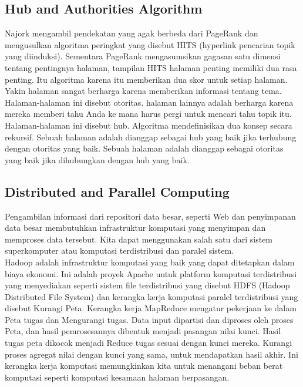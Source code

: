 \documentclass[conference]{IEEEtran}
\begin{document}
\subsection{Hub and Authorities Algorithm}
Najork\cite{najork2007comparing} mengambil pendekatan yang agak berbeda dari PageRank
dan mengusulkan algoritma peringkat yang disebut HITS (hyperlink
pencarian topik yang diinduksi). Sementara PageRank mengasumsikan gagasan satu dimensi tentang pentingnya halaman, tampilan HITS
halaman penting memiliki dua rasa penting.\cite{rajaraman2011mining} Itu
algoritma karena itu memberikan dua skor untuk setiap halaman. Yakin
halaman sangat berharga karena memberikan informasi tentang
tema. Halaman-halaman ini disebut otoritas. halaman lainnya adalah
berharga karena mereka memberi tahu Anda ke mana harus pergi untuk mencari tahu
topik itu. Halaman-halaman ini disebut hub. Algoritma mendefinisikan
dua konsep secara rekursif. Sebuah halaman adalah
dianggap sebagai hub yang baik jika terhubung dengan otoritas yang baik. Sebuah halaman adalah
dianggap sebagai otoritas yang baik jika dihubungkan dengan hub yang baik.\cite{rajaraman2011mining}

\subsection{Distributed and Parallel Computing}
Pengambilan informasi dari repositori data besar, seperti
Web dan penyimpanan data besar membutuhkan infrastruktur komputasi yang
menyimpan dan memproses data tersebut. Kita dapat menggunakan salah satu dari
sistem superkomputer atau komputasi terdistribusi dan paralel
sistem.\\

Hadoop\cite{dean2008mapreduce} adalah infrastruktur komputasi yang baik yang dapat
ditetapkan dalam biaya ekonomi. Ini adalah proyek Apache untuk
platform komputasi terdistribusi yang menyediakan seperti
sistem file terdistribusi yang disebut HDFS (Hadoop Distributed File
System) dan kerangka kerja komputasi paralel terdistribusi yang disebut
Kurangi Peta. Kerangka kerja MapReduce mengatur pekerjaan ke dalam Peta
tugas dan Mengurangi tugas. Data input dipartisi dan diproses
oleh proses Peta, dan hasil pemrosesannya dibentuk menjadi
pasangan nilai kunci. Hasil tugas peta dikocok menjadi Reduce
tugas sesuai dengan kunci mereka. Kurangi proses agregat
nilai dengan kunci yang sama, untuk mendapatkan hasil akhir. Ini
kerangka kerja komputasi memungkinkan kita untuk menangani beban berat
komputasi seperti komputasi kesamaan halaman berpasangan.
\end{document}
